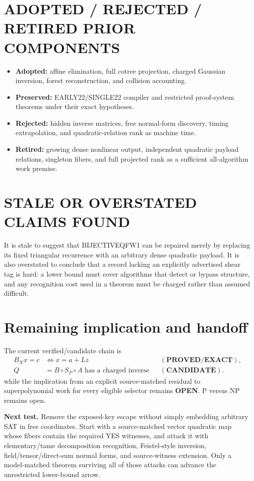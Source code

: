 \documentclass[11pt]{article}
\newcommand{\EXACT}{\textbf{PROVED/EXACT}}
\newcommand{\CAND}{\textbf{CANDIDATE}}
\newcommand{\OPEN}{\textbf{OPEN}}
\begin{document}
\section{ADOPTED / REJECTED / RETIRED PRIOR COMPONENTS}
\begin{itemize}
\item \textbf{Adopted:} affine elimination, full cotree projection,
charged Gaussian inversion, forest reconstruction, and collision accounting.
\item \textbf{Preserved:} EARLY22/SINGLE22 compiler and restricted
proof-system theorems under their exact hypotheses.
\item \textbf{Rejected:} hidden inverse matrices, free normal-form discovery,
timing extrapolation, and quadratic-relation rank as machine time.
\item \textbf{Retired:} growing dense nonlinear output, independent
quadratic payload relations, singleton fibers, and full projected rank as a
sufficient all-algorithm work premise.
\end{itemize}

\section{STALE OR OVERSTATED CLAIMS FOUND}
It is stale to suggest that BIJECTIVEQFW1 can be repaired merely by replacing
its fixed triangular recurrence with an arbitrary dense quadratic payload.
It is also overstated to conclude that a record lacking an explicitly
advertised shear tag is hard: a lower bound must cover algorithms that detect
or bypass structure, and any recognition cost used in a theorem must be
charged rather than assumed difficult.

\section{Remaining implication and handoff}
The current verified/candidate chain is
\[
\begin{aligned}
 B_Xx=c&\Longleftrightarrow x=a+Lz &&(\EXACT),\\
 Q&=B\circ S_P\circ A\text{ has a charged inverse} &&(\CAND).
\end{aligned}
\]
while the implication from an explicit source-matched residual to
superpolynomial work for every eligible selector remains \OPEN{}.  P versus
NP remains open.

\textbf{Next test.}  Remove the exposed-key escape without simply embedding
arbitrary SAT in free coordinates.  Start with a source-matched vector
quadratic map whose fibers contain the required YES witnesses, and attack it
with elementary/tame decomposition recognition, Feistel-style inversion,
field/tensor/direct-sum normal forms, and source-witness extension.  Only a
model-matched theorem surviving all of those attacks can advance the
unrestricted lower-bound arrow.
\end{document}
